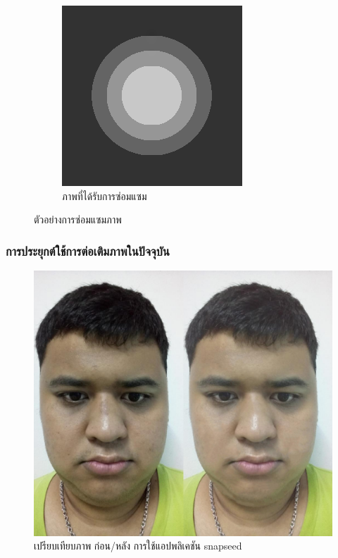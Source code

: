 \documentclass[xcolor=dvipsnames, xetex,serif]{beamer}
\numberwithin{equation}{section}
\begin{document}
\begin{frame}
\begin{figure}[H]
\begin{subfigure}{0.3\linewidth}
				\end{subfigure}
				\begin{subfigure}{0.3\linewidth}
					\centering
					\includegraphics[width=0.8\linewidth]{images/grayscale_inpaint/result_splitbergman.png}
					\caption{ภาพที่ได้รับการซ่อมแซม}
				\end{subfigure}
				\caption{ตัวอย่างการซ่อมแซมภาพ}
				\label{fig1}
			\end{figure}
		\end{frame} 		
		\begin{frame}
			\frametitle{การประยุกต์ใช้การต่อเติมภาพในปัจจุบัน}
			\begin{figure}[H]
				\centering
				\includegraphics[width=0.6\linewidth]{images/self-beauty.jpg}
				\caption{เปรียบเทียบภาพ ก่อน/หลัง การใช้แอปพลิเคชัน snapseed}
				\label{image:self-beauty}
			\end{figure}
		\end{frame} 		
\end{document}
